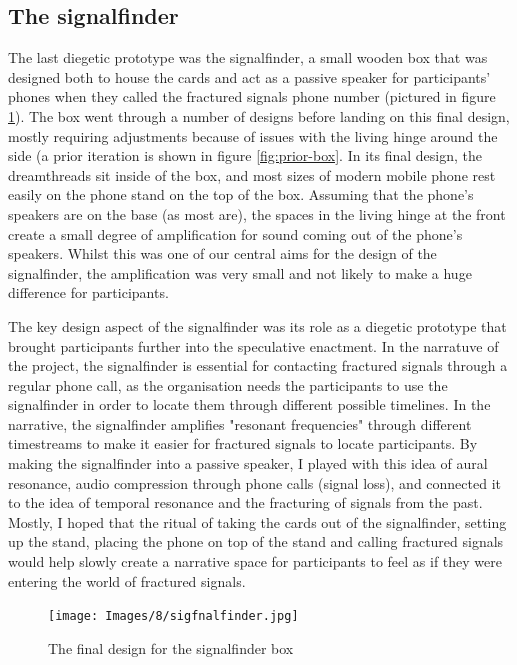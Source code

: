 \subsection{The signalfinder}

The last diegetic prototype was the signalfinder, a small wooden box that was designed both to house the cards and act as a passive speaker for participants’ phones when they called the fractured signals phone number (pictured in figure \ref{fig:signalfinder}). The box went through a number of designs before landing on this final design, mostly requiring adjustments because of issues with the living hinge around the side (a prior iteration is shown in figure \ref{fig:prior-box}. In its final design, the dreamthreads sit inside of the box, and most sizes of modern mobile phone rest easily on the phone stand on the top of the box. Assuming that the phone’s speakers are on the base (as most are), the spaces in the living hinge at the front create a small degree of amplification for sound coming out of the phone’s speakers. Whilst this was one of our central aims for the design of the signalfinder, the amplification was very small and not likely to make a huge difference for participants. 

The key design aspect of the signalfinder was its role as a diegetic prototype that brought participants further into the speculative enactment. In the narratuve of the project, the signalfinder is essential for contacting fractured signals through a regular phone call, as the organisation needs the participants to use the signalfinder in order to locate them through different possible timelines. In the narrative, the signalfinder amplifies "resonant frequencies" through different timestreams to make it easier for fractured signals to locate participants. By making the signalfinder into a passive speaker, I played with this idea of aural resonance, audio compression through phone calls (signal loss), and connected it to the idea of temporal resonance and the fracturing of signals from the past. Mostly, I hoped that the ritual of taking the cards out of the signalfinder, setting up the stand, placing the phone on top of the stand and calling fractured signals would help slowly create a narrative space for participants to feel as if they were entering the world of fractured signals. 

\begin{figure}
    \centering
    \texttt{[image: Images/8/sigfnalfinder.jpg]}
    \caption{The final design for the signalfinder box}
    \label{fig:signalfinder}
\end{figure}

